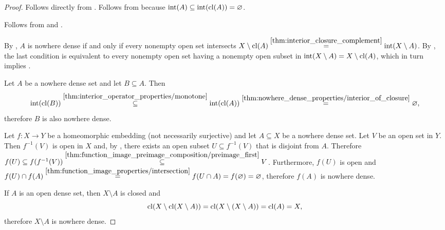 \begin{proof}
   Follows directly from .
   Follows from  because \( \operatorname{int}(A) \subseteq \operatorname{int}(\operatorname{cl}(A)) = \varnothing \).

   Follows from  and .

   By , \( A \) is nowhere dense if and only if every nonempty open set intersects \( X \setminus \operatorname{cl}(A) \overset {\ref{thm:interior_closure_complement}} = \operatorname{int}(X \setminus A) \). By , the last condition is equivalent to every nonempty open set having a nonempty open subset in \( \operatorname{int}(X \setminus A) = X \setminus \operatorname{cl}(A) \), which in turn implies .

   Let \( A \) be a nowhere dense set and let \( B \subseteq A \). Then
  \begin{equation*}
    \operatorname{int}(\operatorname{cl}(B))
    \overset {\ref{thm:interior_operator_properties/monotone}} \subseteq
    \operatorname{int}(\operatorname{cl}(A))
    \overset {\ref{thm:nowhere_dense_properties/interior_of_closure}} =
    \varnothing,
  \end{equation*}
  therefore \( B \) is also nowhere dense.

   Let \( f: X \to Y \) be a homeomorphic embedding (not necessarily surjective) and let \( A \subseteq X \) be a nowhere dense set. Let \( V \) be an open set in \( Y \). Then \( f^{-1}(V) \) is open in \( X \) and, by , there exists an open subset \( U \subseteq f^{-1}(V) \) that is disjoint from \( A \). Therefore \( f(U) \subseteq f(f^{-1}(V)) \overset {\ref{thm:function_image_preimage_composition/preimage_first}} \subseteq V \). Furthermore, \( f(U) \) is open and \( f(U) \cap f(A) \overset {\ref{thm:function_image_properties/intersection}} = f(U \cap A) = f(\varnothing) = \varnothing \), therefore \( f(A) \) is nowhere dense.

   If \( A \) is an open dense set, then \( X \setminus A \) is closed and
  \begin{equation*}
    \operatorname{cl}(X \setminus \operatorname{cl}(X \setminus A))
    =
    \operatorname{cl}(X \setminus (X \setminus A))
    =
    \operatorname{cl}(A)
    =
    X,
  \end{equation*}
  therefore \( X \setminus A \) is nowhere dense.
\end{proof}

